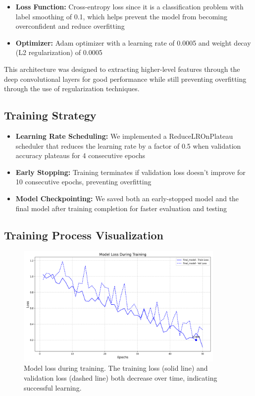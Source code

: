 \documentclass[10pt]{article}
\begin{document}
\begin{itemize}
    \item \textbf{Loss Function:} Cross-entropy loss since it is a classification problem with label smoothing of 0.1, which helps prevent the model from becoming overconfident and reduce overfitting
    
    \item \textbf{Optimizer:} Adam optimizer with a learning rate of 0.0005 and weight decay (L2 regularization) of 0.0005
\end{itemize}

This architecture was designed to extracting higher-level features through the deep convolutional layers for good performance while still preventing overfitting through the use of regularization techniques.

\subsection{Training Strategy}

\begin{itemize}
    \item \textbf{Learning Rate Scheduling:} We implemented a ReduceLROnPlateau scheduler that reduces the learning rate by a factor of 0.5 when validation accuracy plateaus for 4 consecutive epochs
    
    \item \textbf{Early Stopping:} Training terminates if validation loss doesn't improve for 10 consecutive epochs, preventing overfitting
    
    \item \textbf{Model Checkpointing:} We saved both an early-stopped model and the final model after training completion for faster evaluation and testing
\end{itemize}

\subsection{Training Process Visualization}

\begin{figure}[H]
    \centering
    \includegraphics[width=0.9\textwidth]{figures/loss_curves.png}
    \caption{Model loss during training. The training loss (solid line) and validation loss (dashed line) both decrease over time, indicating successful learning.}
    \label{fig:model_loss}
\end{figure}
\end{document}
